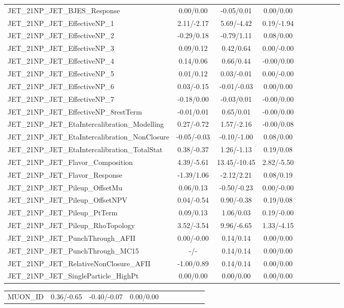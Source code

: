 \begin{table}[h]
\begin{center}
\begin{tabular}{l|ccccccccc}
JET\_21NP\_JET\_BJES\_Response &0.00/0.00 &-0.05/0.01 &0.00/0.00 \\
JET\_21NP\_JET\_EffectiveNP\_1 &2.11/-2.17 &5.69/-4.42 &0.19/-1.94 \\
JET\_21NP\_JET\_EffectiveNP\_2 &-0.29/0.18 &-0.79/1.11 &0.08/0.00 \\
JET\_21NP\_JET\_EffectiveNP\_3 &0.09/0.12 &0.42/0.64 &0.00/-0.00 \\
JET\_21NP\_JET\_EffectiveNP\_4 &0.14/0.06 &0.66/0.44 &-0.00/0.00 \\
JET\_21NP\_JET\_EffectiveNP\_5 &0.01/0.12 &0.03/-0.01 &0.00/-0.00 \\
JET\_21NP\_JET\_EffectiveNP\_6 &0.03/-0.15 &-0.01/-0.03 &0.00/0.00 \\
JET\_21NP\_JET\_EffectiveNP\_7 &-0.18/0.00 &-0.03/0.01 &-0.00/0.00 \\
JET\_21NP\_JET\_EffectiveNP\_8restTerm &-0.01/0.01 &0.65/0.01 &-0.00/0.00 \\
JET\_21NP\_JET\_EtaIntercalibration\_Modelling &0.27/-0.72 &1.57/-2.16 &-0.00/0.08 \\
JET\_21NP\_JET\_EtaIntercalibration\_NonClosure &-0.05/-0.03 &-0.10/-1.00 &0.08/0.00 \\
JET\_21NP\_JET\_EtaIntercalibration\_TotalStat &0.38/-0.37 &1.26/-1.13 &0.19/0.08 \\
JET\_21NP\_JET\_Flavor\_Composition &4.39/-5.61 &13.45/-10.45 &2.82/-5.50 \\
JET\_21NP\_JET\_Flavor\_Response &-1.39/1.06 &-2.12/2.21 &0.08/0.19 \\
JET\_21NP\_JET\_Pileup\_OffsetMu &0.06/0.13 &-0.50/-0.23 &0.00/-0.00 \\
JET\_21NP\_JET\_Pileup\_OffsetNPV &0.04/-0.54 &0.90/-0.38 &0.19/0.08 \\
JET\_21NP\_JET\_Pileup\_PtTerm &0.09/0.13 &1.06/0.03 &0.19/-0.00 \\
JET\_21NP\_JET\_Pileup\_RhoTopology &3.52/-3.54 &9.96/-6.65 &1.33/-4.15 \\
JET\_21NP\_JET\_PunchThrough\_AFII &0.00/-0.00 &0.14/0.14 &0.00/0.00 \\
JET\_21NP\_JET\_PunchThrough\_MC15 &-/- &0.14/0.14 &0.00/0.00 \\
JET\_21NP\_JET\_RelativeNonClosure\_AFII &-1.00/0.89 &0.14/0.14 &0.00/0.00 \\
JET\_21NP\_JET\_SingleParticle\_HighPt &0.00/0.00 &0.00/0.00 &0.00/0.00 \\
\hline \end{tabular} \end{center} \end{table} \begin{table}[h] \scriptsize \begin{center} \begin{tabular}{l|ccccccccc} \hline MUON\_ID &0.36/-0.65 &-0.40/-0.07 &0.00/0.00 \\

\end{tabular}
\end{center}
\end{table}
